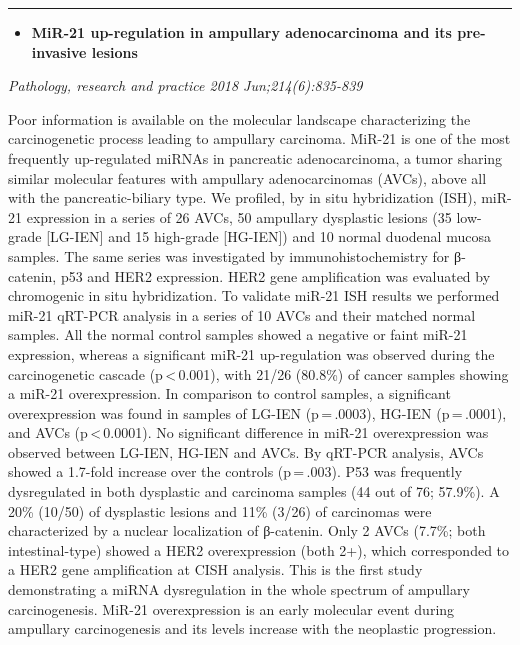 \documentclass[]{article}
\providecommand{\tightlist}{%
  \setlength{\itemsep}{0pt}\setlength{\parskip}{0pt}}
\begin{document}
\begin{center}\rule{0.5\linewidth}{\linethickness}\end{center}

\begin{itemize}
\tightlist
\item
  \textbf{MiR-21 up-regulation in ampullary adenocarcinoma and its
  pre-invasive lesions}
\end{itemize}

\emph{Pathology, research and practice 2018 Jun;214(6):835-839}

Poor information is available on the molecular landscape characterizing
the carcinogenetic process leading to ampullary carcinoma. MiR-21 is one
of the most frequently up-regulated miRNAs in pancreatic adenocarcinoma,
a tumor sharing similar molecular features with ampullary
adenocarcinomas (AVCs), above all with the pancreatic-biliary type. We
profiled, by in situ hybridization (ISH), miR-21 expression in a series
of 26 AVCs, 50 ampullary dysplastic lesions (35 low-grade {[}LG-IEN{]}
and 15 high-grade {[}HG-IEN{]}) and 10 normal duodenal mucosa samples.
The same series was investigated by immunohistochemistry for β-catenin,
p53 and HER2 expression. HER2 gene amplification was evaluated by
chromogenic in situ hybridization. To validate miR-21 ISH results we
performed miR-21 qRT-PCR analysis in a series of 10 AVCs and their
matched normal samples. All the normal control samples showed a negative
or faint miR-21 expression, whereas a significant miR-21 up-regulation
was observed during the carcinogenetic cascade (p\,\textless{}\,0.001),
with 21/26 (80.8\%) of cancer samples showing a miR-21 overexpression.
In comparison to control samples, a significant overexpression was found
in samples of LG-IEN (p\,=\,.0003), HG-IEN (p\,=\,.0001), and AVCs
(p\,\textless{}\,0.0001). No significant difference in miR-21
overexpression was observed between LG-IEN, HG-IEN and AVCs. By qRT-PCR
analysis, AVCs showed a 1.7-fold increase over the controls
(p\,=\,.003). P53 was frequently dysregulated in both dysplastic and
carcinoma samples (44 out of 76; 57.9\%). A 20\% (10/50) of dysplastic
lesions and 11\% (3/26) of carcinomas were characterized by a nuclear
localization of β-catenin. Only 2 AVCs (7.7\%; both intestinal-type)
showed a HER2 overexpression (both 2+), which corresponded to a HER2
gene amplification at CISH analysis. This is the first study
demonstrating a miRNA dysregulation in the whole spectrum of ampullary
carcinogenesis. MiR-21 overexpression is an early molecular event during
ampullary carcinogenesis and its levels increase with the neoplastic
progression.
\end{document}
